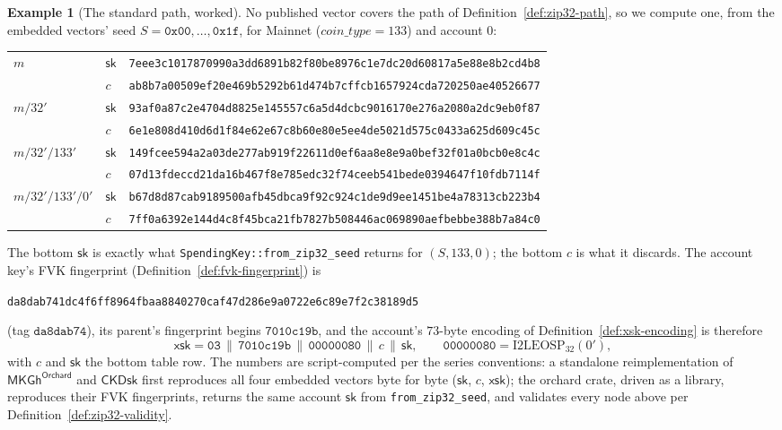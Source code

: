 \documentclass[11pt,a4paper]{article}
\theoremstyle{definition}
\newtheorem{example}[theorem]{Example}
\begin{document}
\begin{example}[The standard path, worked]\label{ex:zip32-standard-path}
No published vector covers the path of Definition~\ref{def:zip32-path}, so
we compute one, from the embedded vectors' seed
$S = \mathtt{0x00}, \dots, \mathtt{0x1f}$, for Mainnet
($\mathit{coin\_type} = 133$) and account $0$:
\begin{center}
\small
\begin{tabular}{@{}lll@{}}
\toprule
$m$ & $\mathsf{sk}$ &
  \texttt{7eee3c1017870990a3dd6891b82f80be8976c1e7dc20d60817a5e88e8b2cd4b8} \\
 & $c$ &
  \texttt{ab8b7a00509ef20e469b5292b61d474b7cffcb1657924cda720250ae40526677} \\
\addlinespace
$m/32'$ & $\mathsf{sk}$ &
  \texttt{93af0a87c2e4704d8825e145557c6a5d4dcbc9016170e276a2080a2dc9eb0f87} \\
 & $c$ &
  \texttt{6e1e808d410d6d1f84e62e67c8b60e80e5ee4de5021d575c0433a625d609c45c} \\
\addlinespace
$m/32'/133'$ & $\mathsf{sk}$ &
  \texttt{149fcee594a2a03de277ab919f22611d0ef6aa8e8e9a0bef32f01a0bcb0e8c4c} \\
 & $c$ &
  \texttt{07d13fdeccd21da16b467f8e785edc32f74ceeb541bede0394647f10fdb7114f} \\
\addlinespace
$m/32'/133'/0'$ & $\mathsf{sk}$ &
  \texttt{b67d8d87cab9189500afb45dbca9f92c924c1de9d9ee1451be4a78313cb223b4} \\
 & $c$ &
  \texttt{7ff0a6392e144d4c8f45bca21fb7827b508446ac069890aefbebbe388b7a84c0} \\
\bottomrule
\end{tabular}
\end{center}
The bottom $\mathsf{sk}$ is exactly what
\texttt{SpendingKey::from\_zip32\_seed} returns for $(S, 133, 0)$; the
bottom $c$ is what it discards. The account key's FVK fingerprint
(Definition~\ref{def:fvk-fingerprint}) is
\begin{center}
\small
\texttt{da8dab741dc4f6ff8964fbaa8840270caf47d286e9a0722e6c89e7f2c38189d5}
\end{center}
(tag $\mathtt{da8dab74}$), its parent's fingerprint begins
$\mathtt{7010c19b}$, and the account's $73$-byte encoding of
Definition~\ref{def:xsk-encoding} is therefore
\[
\mathsf{xsk} = \mathtt{03} \,\|\, \mathtt{7010c19b} \,\|\,
\mathtt{00000080} \,\|\, c \,\|\, \mathsf{sk},
\qquad \mathtt{00000080} = \mathrm{I2LEOSP}_{32}(0'),
\]
with $c$ and $\mathsf{sk}$ the bottom table row. The numbers are
script-computed per the series conventions: a standalone reimplementation
of $\mathsf{MKGh}^{\mathsf{Orchard}}$ and $\mathsf{CKDsk}$ first
reproduces all four embedded vectors byte for byte ($\mathsf{sk}$, $c$,
$\mathsf{xsk}$); the \textsf{orchard} crate, driven as a library,
reproduces their FVK fingerprints, returns the same account $\mathsf{sk}$
from \texttt{from\_zip32\_seed}, and validates every node above per
Definition~\ref{def:zip32-validity}.
\end{example}
\end{document}
